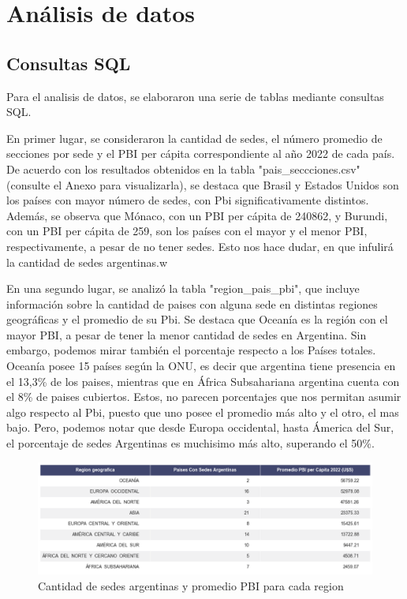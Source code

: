 \documentclass[10pt,a4paper]{article}
\begin{document}
\newpage

\section{Análisis de datos}

\subsection{Consultas SQL}

Para el analisis de datos, se elaboraron una serie de tablas mediante consultas SQL.

En primer lugar, se consideraron la cantidad de sedes, el número promedio de secciones por sede y el PBI per cápita correspondiente al año 2022 de cada país.
De acuerdo con los resultados obtenidos en la tabla "pais\_seccciones.csv" (consulte el Anexo para visualizarla), se destaca que Brasil y Estados Unidos son los países con mayor número de sedes, con Pbi significativamente distintos. Además, se observa que Mónaco, con un PBI per cápita de 240862, y Burundi, con un PBI per cápita de 259, son los países con el mayor y el menor PBI, respectivamente, a pesar de no tener sedes. Esto nos hace dudar, en que infulirá la cantidad de sedes argentinas.w

\vspace{0.1cm}

En una segundo lugar, se analizó la tabla "region\_pais\_pbi", que incluye información sobre la cantidad de paises con alguna sede en distintas regiones geográficas y el promedio de su Pbi. Se destaca que Oceanía es la región con el mayor PBI, a pesar de tener la menor cantidad de sedes en Argentina. Sin embargo, podemos mirar también el porcentaje respecto a los Países totales. Oceanía posee 15 países según la ONU, es decir que argentina tiene presencia en el 13,3\% de los paises, mientras que en África Subsahariana argentina cuenta con el 8\% de paises cubiertos. Estos, no parecen porcentajes que nos permitan asumir algo respecto al Pbi, puesto que uno posee el promedio más alto y el otro, el mas bajo. Pero, podemos notar que desde Europa occidental, hasta Ámerica del Sur, el porcentaje de sedes Argentinas es muchisimo más alto, superando el 50\%.

\vspace{12pt}

\begin{figure}[h]
  \centering
  \includegraphics[width=1.0\textwidth]{TABLARegion.png}
  \caption{ Cantidad de sedes argentinas y promedio PBI para  cada region}
  \label{fig:Tabla 1}
\end{figure}
\end{document}
